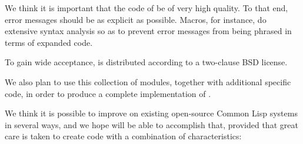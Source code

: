 We think it is important that the code of
\sysname{} be of very high quality.  To that end, error messages
should be as explicit as possible.  Macros, for instance, do extensive
syntax analysis so as to prevent error messages from being phrased in
terms of expanded code.

To gain wide acceptance, \sysname{} is distributed according to a
two-clause BSD license.

We also plan to use this collection of modules, together with
additional specific code, in order to produce a complete
implementation of \commonlisp{}.

We think it is possible to improve on existing open-source Common Lisp
systems in several ways, and we hope \sysname{} will be able to
accomplish that, provided that great care is taken to create code with
a combination of characteristics:

